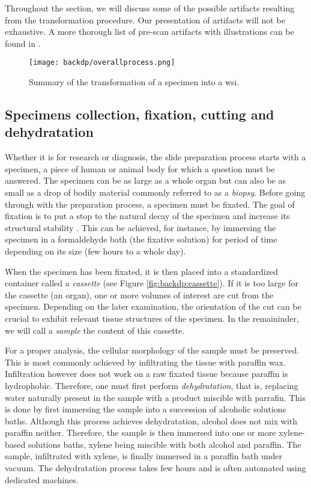 Throughout the section, we will discuss some of the possible artifacts resulting from the transformation procedure. Our presentation of artifacts will not be exhaustive. A more thorough list of pre-scan artifacts with illustrations can be found in \parencite{taqi2018review}.

\begin{figure}
  \centering
  \texttt{[image: backdp/overallprocess.png]}
  \caption{Summary of the transformation of a specimen into a \acrlong{wsi}.}
  \label{fig:backdp:overallprocess}
\end{figure}

\subsection{Specimens collection, fixation, cutting and dehydratation}

Whether it is for research or diagnosis, the slide preparation process starts with a specimen, a piece of human or animal body for which a question must be answered. The specimen can be as large as a whole organ but can also be as small as a drop of bodily material commonly referred to as a \textit{biopsy}. Before going through with the preparation process, a specimen must be fixated. The goal of fixation is to put a stop to the natural decay of the specimen and increase its structural stability \parencite{rolls2012process}. This can be achieved, for instance, by immersing the specimen in a formaldehyde bath (\ie the fixative solution) for period of time depending on its size (\ie few hours to a whole day). 

When the specimen has been fixated, it is then placed into a standardized container called a \textit{cassette} (see Figure \ref{fig:backdp:cassette}). If it is too large for the cassette (\eg an organ), one or more volumes of interest are cut from the specimen. Depending on the later examination, the orientation of the cut can be crucial to exhibit relevant tissue structures of the specimen. In the remaininder, we will call a \textit{sample} the content of this cassette.

For a proper analysis, the cellular morphology of the sample must be preserved. This is most commonly achieved by infiltrating the tissue with paraffin wax. Infiltration however does not work on a raw fixated tissue because paraffin is hydrophobic. Therefore, one must first perform \textit{dehydratation}, that is, replacing water naturally present in the sample with a product miscible with parrafin. This is done by first immersing the sample into a succession of alcoholic solutions baths. Although this process achieves dehydratation, alcohol does not mix with paraffin neither. Therefore, the sample is then immersed into one or more xylene-based solutions baths, xylene being miscible with both alcohol and paraffin. The sample, infiltrated with xylene, is finally immersed in a paraffin bath under vacuum. The dehydratation process takes few hours and is often automated using dedicated machines.

